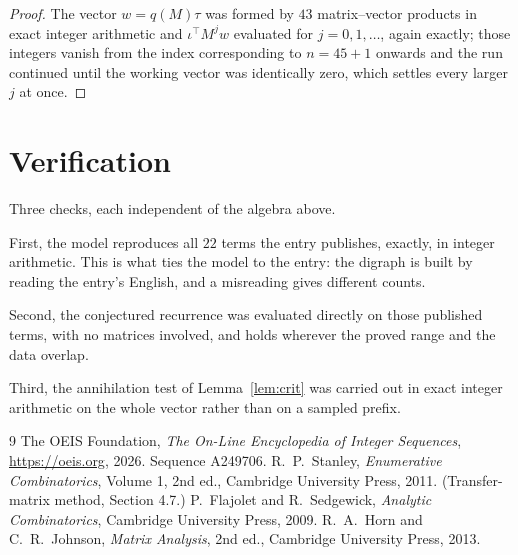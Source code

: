 \documentclass[11pt,a4paper]{article}
\theoremstyle{plain}
\theoremstyle{definition}
\begin{document}
\begin{proof}
The vector $w=q(M)\tau$ was formed by $43$ matrix--vector products in exact integer
arithmetic and $\iota^{\!\top}M^{j}w$ evaluated for $j=0,1,\dots$, again exactly; those
integers vanish from the index corresponding to $n=45+1$ onwards and the run continued
until the working vector was identically zero, which settles every larger $j$ at once.
\end{proof}

\section{Verification}

Three checks, each independent of the algebra above.

First, the model reproduces all $22$ terms the entry publishes, exactly, in integer
arithmetic. This is what ties the model to the entry: the digraph is built by reading the
entry's English, and a misreading gives different counts.

Second, the conjectured recurrence was evaluated directly on those published terms, with no
matrices involved, and holds wherever the proved range and the data overlap.

Third, the annihilation test of Lemma~\ref{lem:crit} was carried out in exact integer
arithmetic on the whole vector rather than on a sampled prefix.

\begin{thebibliography}{9}
 The OEIS Foundation, \emph{The On-Line Encyclopedia of Integer
Sequences}, \url{https://oeis.org}, 2026. Sequence A249706.
 R.~P.~Stanley, \emph{Enumerative Combinatorics}, Volume 1, 2nd ed.,
Cambridge University Press, 2011. (Transfer-matrix method, Section 4.7.)
 P.~Flajolet and R.~Sedgewick, \emph{Analytic Combinatorics}, Cambridge
University Press, 2009.
 R.~A.~Horn and C.~R.~Johnson, \emph{Matrix Analysis}, 2nd ed., Cambridge
University Press, 2013.
\end{thebibliography}
\end{document}
